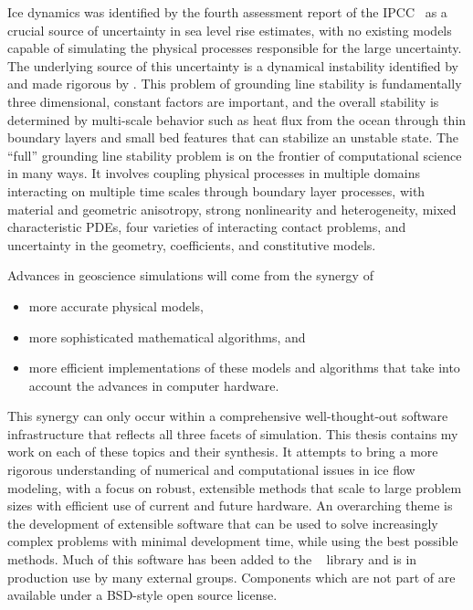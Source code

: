 Ice dynamics was identified by the fourth assessment report of the IPCC~\cite{lemk2007ar4wg1} as a crucial source of uncertainty in sea level rise estimates, with no existing models capable of simulating the physical processes responsible for the large uncertainty.
The underlying source of this uncertainty is a dynamical instability identified by \cite{weertman1974sji} and made rigorous by \cite{schoof2007isg}.
This problem of grounding line stability is fundamentally three dimensional, constant factors are important, and the overall stability is determined by multi-scale behavior such as heat flux from the ocean through thin boundary layers and small bed features that can stabilize an unstable state.
The ``full'' grounding line stability problem is on the frontier of computational science in many ways.
It involves coupling physical processes in multiple domains interacting on multiple time scales through boundary layer processes, with material and geometric anisotropy, strong nonlinearity and heterogeneity, mixed characteristic PDEs, four varieties of interacting contact problems, and uncertainty in the geometry, coefficients, and constitutive models.

Advances in geoscience simulations will come from the synergy of
\begin{itemize}
\item more accurate physical models,
\item more sophisticated mathematical algorithms, and
\item more efficient implementations of these models and algorithms that take into account the advances in computer hardware.
\end{itemize}
This synergy can only occur within a comprehensive well-thought-out software infrastructure that reflects all three facets of simulation.
This thesis contains my work on each of these topics and their synthesis.
It attempts to bring a more rigorous understanding of numerical and computational issues in ice flow modeling, with a focus on robust, extensible methods that scale to large problem sizes with efficient use of current and future hardware.
An overarching theme is the development of extensible software that can be used to solve increasingly complex problems with minimal development time, while using the best possible methods.
Much of this software has been added to the {\PETSc}~\cite{petsc-user-ref} library and is in production use by many external groups.
Components which are not part of {\PETSc} are available under a BSD-style open source license.

